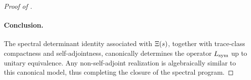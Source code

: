 \begin{proof}[Proof of ]
\paragraph{Conclusion.}
The spectral determinant identity associated with \( \Xi(s) \), together with trace-class compactness and self-adjointness, canonically determines the operator \( L_{\mathrm{sym}} \) up to unitary equivalence. Any non-self-adjoint realization is algebraically similar to this canonical model, thus completing the closure of the spectral program.
\end{proof}
